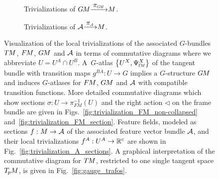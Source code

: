 \begin{figure}
\begin{subfigure}[b]{.4\textwidth}
        \caption{\small
            Trivializations of
            $\GM {\xrightarrow{\scalebox{1}{$\,\pi_{\scalebox{.55}{$\GM$}}\,$}}} M$.
        }
        \label{fig:trivialization_FM_simplified}
    \end{subfigure}
    \hspace*{7ex}
    \begin{subfigure}[b]{.4\textwidth}
        \centering
        \caption{\small
            Trivializations of
            $\A {\xrightarrow{\scalebox{1}{$\,\pi_{\scalebox{.55}{$\A$}}\,$}}} M$.
        }
        \label{fig:trivialization_A}
    \end{subfigure}
    \vspace*{1ex}
    \caption{\small
        Visualization of the local trivializations of the associated $G$-bundles $T\mkern-1.5muM$, $F\mkern-1.5muM$, $G\mkern-1.4muM$ and $\mathcal{A}$ in terms of commutative diagrams where we abbreviate $U=U^A\cap U^B$.
        A~$G$-atlas $\big\{ U^X, \PsiTM^X \big\}$ of the tangent bundle with transition maps $g^{BA}: U \to G$ implies a $G$-structure $G\mkern-1.4muM$ and induces $G$-atlases for $F\mkern-1.5muM$, $G\mkern-1.4muM$ and $\mathcal{A}$ with compatible transition functions.
        More detailed commutative diagrams which show sections $\sigma:U\to\pi_{\scriptstyle\!F\!M}^{-1}(U)$ and the right action $\lhd$ on the frame bundle are given in Figs.~\ref{fig:trivialization_FM_non-collapsed} and~\ref{fig:trivialization_FM_section}.
        Feature fields, modeled as sections $f:M\to\mathcal{A}$ of the associated feature vector bundle $\mathcal{A}$, and their local trivializations $f^A:U^A\to\mathbb{R}^c$ are shown in Fig.~\ref{fig:trivialization_A_sections}.
        A graphical interpretation of the commutative diagram for $T\mkern-1.5muM$, restricted to one single tangent space $T_{\mkern-1.5mu p}\mkern-.5muM$, is given in Fig.~\ref{fig:gauge_trafos}.
    }
    \label{fig:trivializations_TM_FM_A}
\end{figure}













